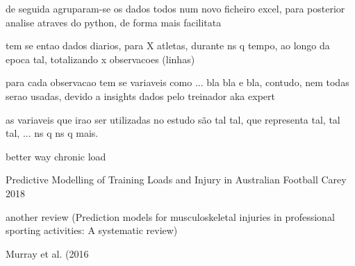 \documentclass[conference]{IEEEtran}
\begin{document}
de seguida agruparam-se os dados todos num novo ficheiro excel, para posterior analise atraves do python, de forma mais facilitata

tem se entao dados diarios, para X atletas, durante ns q tempo, ao longo da epoca tal, totalizando x observacoes (linhas)

para cada observacao tem se variaveis como ... bla bla e bla, contudo, nem todas serao usadas, devido a insights dados pelo treinador aka expert

as variaveis que irao ser utilizadas no estudo são tal tal, que representa tal, tal tal, ... ns q ns q mais.

\cite{Williams17} better way chronic load

\cite{Carey_2018} Predictive Modelling of Training Loads and Injury in Australian Football Carey 2018

\cite{Seow20} another review (Prediction models for musculoskeletal injuries in professional sporting activities: A systematic review)

\cite{Murray16} Murray et al. (2016







\end{document}

